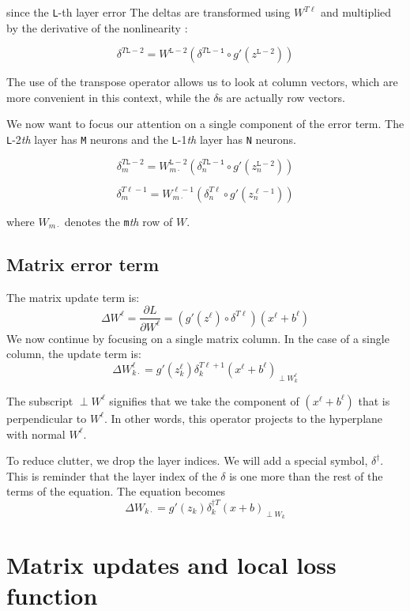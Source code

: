 \documentclass[]{article}
\begin{document}
 		
 		since the \texttt{L}-th layer error 
 		The deltas are transformed using $W^{T\ell}$ and multiplied by the derivative of the nonlinearity :
 		
 		$$\delta^{T\mathtt{L}-2} = W^{\mathtt{L}-2} (\delta^{T\mathtt{L-1}} \circ g'(z^{\mathtt{L}-2}))$$
 		
 		The use of the transpose operator allows us to look at column vectors, which are more convenient in this context, while the $\delta$s are actually row vectors.
 		
 		We now want to focus our attention on a single component of the error term. The \texttt{L}-2\textit{th} layer has \texttt{M} neurons and the \texttt{L}-1\textit{th} layer has \texttt{N} neurons.
 		
 		
 		$$\delta^{T\mathtt{L}-2}_m = W^{\mathtt{L}-2}_{m \cdot} (\delta^{T\mathtt{L-1}}_n \circ g'(z^{\mathtt{L}-2}_n))$$
 		
 		$$\delta^{T\ell-1}_m = W^{\ell-1}_{m \cdot} (\delta^{T\ell}_n \circ g'(z^{\ell-1}_n))$$
 		
 		where $W_{m\cdot}$ denotes the \texttt{m}\textit{th} row of $W$.
 		 
 		 
 		 
  	\subsection{Matrix error term}
		The matrix update term is:
  			$$ \Delta W^\ell = \frac{\partial L}{\partial W^\ell} = (g'(z^{\ell}) \circ  \delta^{T\ell}) (x^{\ell}+b^{\ell})$$
 		We now continue by focusing on a single matrix column. In the case of a single column, the update term is:
	  		$$\Delta W^\ell_{k\cdot}  = g'(z^{\ell}_k)  \delta^{T\ell+1}_k (x^{\ell}+b^{\ell})_{\perp W^\ell_k}$$
		

	  	The subscript $\perp W^\ell$ signifies that we take the component of $(x^{\ell}+b^{\ell})$ that is perpendicular to $W^\ell$. In other words, this operator projects to the hyperplane with normal $W^\ell$.
	  	
	  	To reduce clutter, we drop the layer indices. We will add a special symbol, $\delta^\dagger$. This is reminder that the layer index of the $\delta$ is one more than the rest of the terms of the equation. The equation becomes
		  		$$\Delta W_{k\cdot}  = g'(z_k)  \delta^{\dagger T}_k (x+b)_{\perp W_k}$$
	

	\section{Matrix updates and local loss function}
	  	
\end{document}
